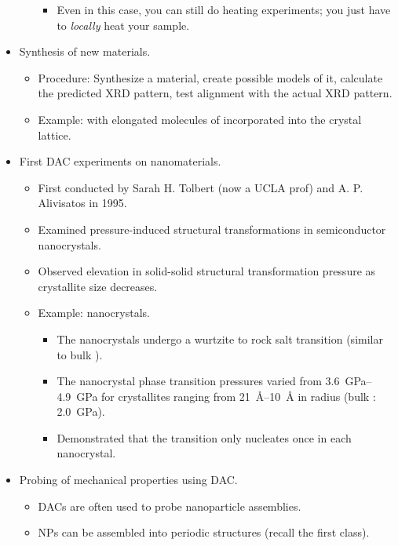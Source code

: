 \documentclass[../notes.tex]{subfiles}
\begin{document}
\begin{itemize}
\begin{itemize}
\begin{itemize}
            \item Even in this case, you can still do heating experiments; you just have to \emph{locally} heat your sample.
        \end{itemize}
    \end{itemize}
    \item Synthesis of new materials.
    \begin{itemize}
        \item Procedure: Synthesize a material, create possible models of it, calculate the predicted XRD pattern, test alignment with the actual XRD pattern.
        \item Example:  with elongated molecules of  incorporated into the crystal lattice.
    \end{itemize}
    \item First DAC experiments on nanomaterials.
    \begin{itemize}
        \item First conducted by Sarah H. Tolbert (now a UCLA prof) and A. P. Alivisatos in 1995.
        \item Examined pressure-induced structural transformations in semiconductor nanocrystals.
        \item Observed elevation in solid-solid structural transformation pressure as crystallite size decreases.
        \item Example:  nanocrystals.
        \begin{itemize}
            \item The  nanocrystals undergo a wurtzite to rock salt transition (similar to bulk ).
            \item The nanocrystal phase transition pressures varied from \SIrange{3.6}{4.9}{\giga\pascal} for crystallites ranging from \SIrange{21}{10}{\angstrom} in radius (bulk : \SI{2.0}{\giga\pascal}).
            \item Demonstrated that the transition only nucleates once in each nanocrystal.
        \end{itemize}
    \end{itemize}
    \item Probing of mechanical properties using DAC.
    \begin{itemize}
        \item DACs are often used to probe nanoparticle assemblies.
        \item NPs can be assembled into periodic structures (recall the first class).

\end{itemize}
\end{itemize}
\end{document}
